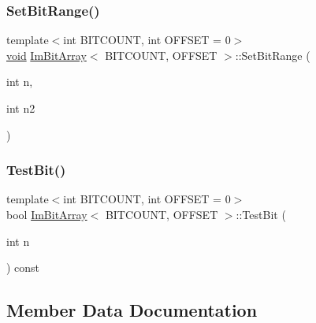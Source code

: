 \mbox{\label{structImBitArray_a7a3a4472aaf1eb8a6fe5f7aeed155b54}} 
\subsubsection{\texorpdfstring{Set\+Bit\+Range()}{SetBitRange()}}
{\footnotesize\ttfamily template$<$int B\+I\+T\+C\+O\+U\+NT, int O\+F\+F\+S\+ET = 0$>$ \\
\hyperlink{imgui__impl__opengl3__loader_8h_ac668e7cffd9e2e9cfee428b9b2f34fa7}{void} \hyperlink{structImBitArray}{Im\+Bit\+Array}$<$ B\+I\+T\+C\+O\+U\+NT, O\+F\+F\+S\+ET $>$\+::Set\+Bit\+Range (\begin{DoxyParamCaption}\item[{int}]{n,  }\item[{int}]{n2 }\end{DoxyParamCaption})\hspace{0.3cm}{\ttfamily [inline]}}

\mbox{\label{structImBitArray_a803e52b9d1653dca6cac959cb84d64e9}} 
\subsubsection{\texorpdfstring{Test\+Bit()}{TestBit()}}
{\footnotesize\ttfamily template$<$int B\+I\+T\+C\+O\+U\+NT, int O\+F\+F\+S\+ET = 0$>$ \\
bool \hyperlink{structImBitArray}{Im\+Bit\+Array}$<$ B\+I\+T\+C\+O\+U\+NT, O\+F\+F\+S\+ET $>$\+::Test\+Bit (\begin{DoxyParamCaption}\item[{int}]{n }\end{DoxyParamCaption}) const\hspace{0.3cm}{\ttfamily [inline]}}



\subsection{Member Data Documentation}
\mbox{\label{structImBitArray_abcacf6438b637293c8b3d475079b7eb6}} 
